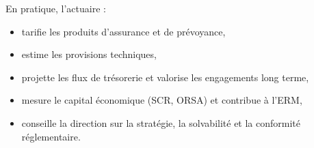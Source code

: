 \begin{f}[Actuaire]
	
	En pratique, l'actuaire :
	\begin{itemize}[nosep]
		\item tarifie les produits d'assurance et de prévoyance, 
		\item estime les provisions techniques,
		\item projette les flux de trésorerie et valorise les engagements long terme,
		\item mesure le capital économique (SCR, ORSA) et contribue à l'ERM,
		\item conseille la direction sur la stratégie, la solvabilité et la conformité réglementaire.
	\end{itemize}
	
\end{f}
